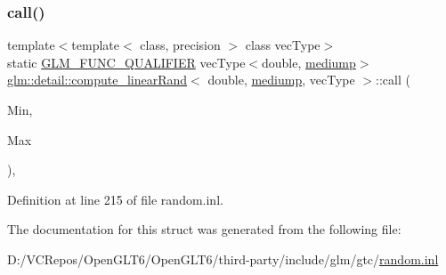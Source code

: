 \subsubsection{\texorpdfstring{call()}{call()}}
{\footnotesize\ttfamily template$<$template$<$ class, precision $>$ class vec\+Type$>$ \\
static \mbox{\hyperlink{setup_8hpp_a33fdea6f91c5f834105f7415e2a64407}{G\+L\+M\+\_\+\+F\+U\+N\+C\+\_\+\+Q\+U\+A\+L\+I\+F\+I\+ER}} vec\+Type$<$double, \mbox{\hyperlink{namespaceglm_a0f04f086094c747d227af4425893f545a6416f3ea0c9025fb21ed50c4d6620482}{mediump}}$>$ \mbox{\hyperlink{structglm_1_1detail_1_1compute__linear_rand}{glm\+::detail\+::compute\+\_\+linear\+Rand}}$<$ double, \mbox{\hyperlink{namespaceglm_a0f04f086094c747d227af4425893f545a6416f3ea0c9025fb21ed50c4d6620482}{mediump}}, vec\+Type $>$\+::call (\begin{DoxyParamCaption}\item[{vec\+Type$<$ double, \mbox{\hyperlink{namespaceglm_a0f04f086094c747d227af4425893f545a6416f3ea0c9025fb21ed50c4d6620482}{mediump}} $>$ const \&}]{Min,  }\item[{vec\+Type$<$ double, \mbox{\hyperlink{namespaceglm_a0f04f086094c747d227af4425893f545a6416f3ea0c9025fb21ed50c4d6620482}{mediump}} $>$ const \&}]{Max }\end{DoxyParamCaption})\hspace{0.3cm}{\ttfamily [inline]}, {\ttfamily [static]}}



Definition at line 215 of file random.\+inl.



The documentation for this struct was generated from the following file\+:\begin{DoxyCompactItemize}
\item 
D\+:/\+V\+C\+Repos/\+Open\+G\+L\+T6/\+Open\+G\+L\+T6/third-\/party/include/glm/gtc/\mbox{\hyperlink{random_8inl}{random.\+inl}}\end{DoxyCompactItemize}

